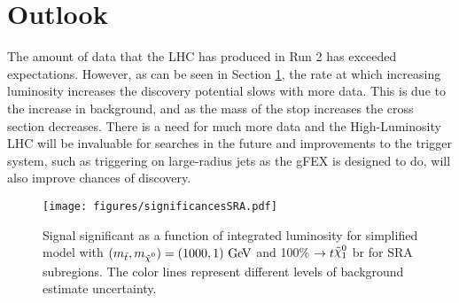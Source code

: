 \section{Outlook}


The amount of data that the LHC has produced in Run 2 has exceeded expectations.  However, as can be seen in Section \ref{fig:1tevstopreach}, the rate at which increasing luminosity increases the discovery potential slows with more data.  This is due to the increase in background, and as the mass of the stop increases the cross section decreases. There is a need for much more data and the High-Luminosity LHC will be invaluable for searches in the future and improvements to the trigger system, such as triggering on large-radius jets as the gFEX is designed to do, will also improve chances of discovery.  \\


\begin{figure}[!h]
	\centering
	\texttt{[image: figures/significancesSRA.pdf]}
	\caption[Significance as a function of integrated luminosity for 1000~\gev\ stop]{Signal significant as a function of integrated luminosity for simplified model with $(\mstop,\mLSP) = (1000,1)~\gev$ and 100\% \stop $\ra t\ninoone$ \gls{br} for SRA subregions. The color lines represent different levels of background estimate uncertainty.}
	\label{fig:1tevstopreach}
\end{figure}
\clearpage



